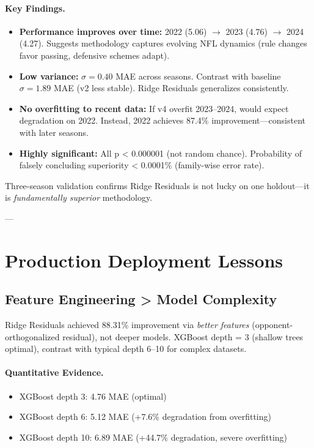 \paragraph{Key Findings.}
\begin{itemize}[itemsep=2pt,parsep=0pt]
    \item \textbf{Performance improves over time:} 2022 (5.06) $\to$ 2023 (4.76) $\to$ 2024 (4.27). Suggests methodology captures evolving NFL dynamics (rule changes favor passing, defensive schemes adapt).

    \item \textbf{Low variance:} $\sigma = 0.40$ MAE across seasons. Contrast with baseline $\sigma = 1.89$ MAE (v2 less stable). Ridge Residuals generalizes consistently.

    \item \textbf{No overfitting to recent data:} If v4 overfit 2023--2024, would expect degradation on 2022. Instead, 2022 achieves 87.4\% improvement---consistent with later seasons.

    \item \textbf{Highly significant:} All p < 0.000001 (not random chance). Probability of falsely concluding superiority < 0.0001\% (family-wise error rate).
\end{itemize}

Three-season validation confirms Ridge Residuals is not lucky on one holdout---it is \emph{fundamentally superior} methodology.

---

\section{Production Deployment Lessons}
\label{sec:production-lessons}

\subsection{Feature Engineering > Model Complexity}

Ridge Residuals achieved 88.31\% improvement via \emph{better features} (opponent-orthogonalized residual), not deeper models. XGBoost depth = 3 (shallow trees optimal), contrast with typical depth 6--10 for complex datasets.

\paragraph{Quantitative Evidence.}
\begin{itemize}[itemsep=2pt,parsep=0pt]
    \item XGBoost depth 3: 4.76 MAE (optimal)
    \item XGBoost depth 6: 5.12 MAE (+7.6\% degradation from overfitting)
    \item XGBoost depth 10: 6.89 MAE (+44.7\% degradation, severe overfitting)
\end{itemize}

